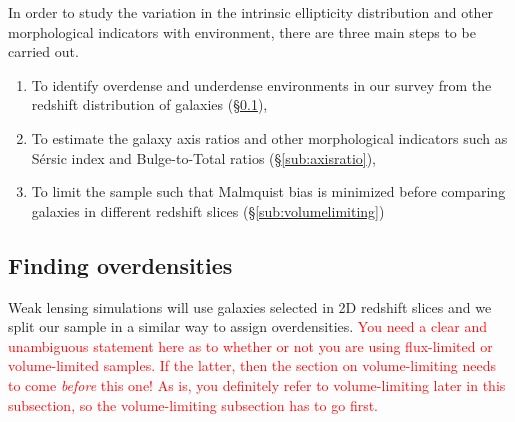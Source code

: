 \documentclass[twocolumn,useAMS,usenatbib]{mn2e}
\newcommand{\rachel}[1]{{\textcolor{red}{#1}}}
\newcommand{\sersic}{S\'{e}rsic }
\begin{document}
In order to study the variation in the intrinsic ellipticity distribution and other morphological indicators with environment, there are three main steps to be carried out.
\begin{enumerate}
 \item To identify overdense and underdense environments in our survey from the redshift distribution of galaxies (\S\ref{sub:overdensities}),
 \item To estimate the galaxy axis ratios and other morphological indicators such as  \sersic index and Bulge-to-Total ratios (\S\ref{sub:axisratio}),
 \item To limit the sample such that Malmquist bias is minimized before comparing galaxies in different redshift slices (\S\ref{sub:volumelimiting})
\end{enumerate}


\subsection{Finding overdensities}
\label{sub:overdensities}


Weak lensing simulations will use galaxies selected in 2D redshift slices and
we split our sample in a similar way to assign overdensities.
\rachel{You need a clear and unambiguous statement here as to whether
  or not you are using flux-limited or volume-limited samples.  If the
  latter, then the section on volume-limiting needs to come {\em
    before} this one!  As is, you definitely refer to volume-limiting
  later in this subsection, so the volume-limiting subsection has to
  go first.}
\end{document}
